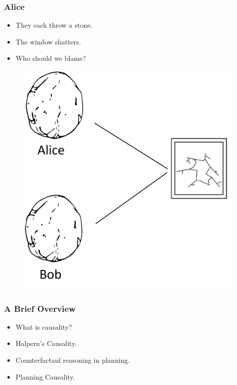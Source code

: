 \documentclass{beamer}
\theoremstyle{plain}
\theoremstyle{definition}
\begin{document}
\begin{frame}
\frametitle{Alice}
\begin{itemize}
\item They each throw a stone.
\item The window shatters.
\item Who should we blame?
\end{itemize}

\begin{figure}
\includegraphics[scale=0.15]{stoneWindow}
\end{figure}

\end{frame}


\begin{frame}
\frametitle{A Brief Overview}
\begin{itemize}
\item What is causality?
\item Halpern's Causality.
\item Counterfactaul reasoning in planning.
\item Planning Causality.
\end{itemize}

\end{frame}
\end{document}
